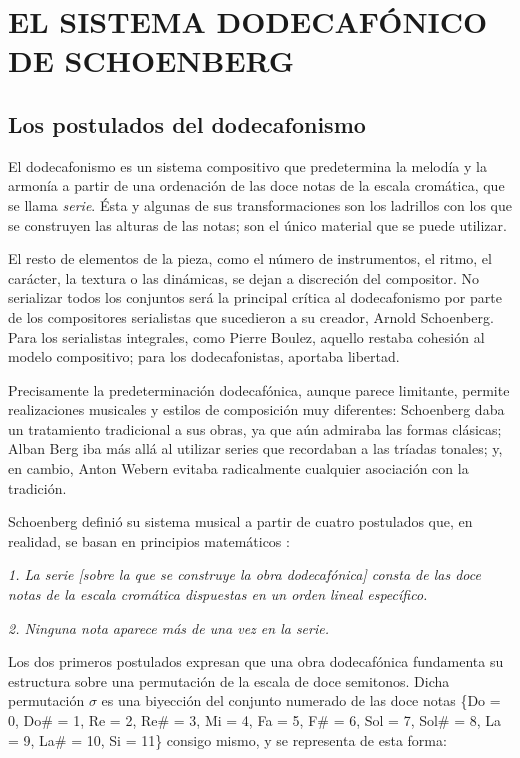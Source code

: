\section[EL SISTEMA DODECAF\'ONICO DE SCHOENBERG]{EL SISTEMA DODECAF\'ONICO DE SCHOENBERG}\label{ch:dodecafonismo}
	\subsection{Los postulados del dodecafonismo}
		El dodecafonismo es un sistema compositivo que predetermina la melod\'ia y la armon\'ia a partir de una ordenaci\'on de las doce notas de la escala crom\'atica, que se llama \textit{serie}. \'Esta y algunas de sus transformaciones son los ladrillos con los que se construyen las alturas de las notas; son el \'unico material que se puede utilizar. 
		
		El resto de elementos de la pieza, como el n\'umero de instrumentos, el ritmo, el car\'acter, la textura o las din\'amicas, se dejan a discreci\'on del compositor. No serializar todos los conjuntos ser\'a la principal cr\'itica al dodecafonismo por parte de los compositores serialistas que sucedieron a su creador, Arnold Schoenberg. Para los serialistas integrales, como Pierre Boulez, aquello restaba cohesi\'on al modelo compositivo; para los dodecafonistas, aportaba libertad. \cite{boulez}
		
		Precisamente la predeterminaci\'on dodecaf\'onica, aunque parece limitante, permite realizaciones musicales y estilos de composici\'on muy diferentes: Schoenberg daba un tratamiento tradicional a sus obras, ya que a\'un admiraba las formas cl\'asicas; Alban Berg iba m\'as all\'a al utilizar series que recordaban a las tr\'iadas tonales; y, en cambio, Anton Webern evitaba radicalmente cualquier asociaci\'on con la tradici\'on. 
		
		Schoenberg defini\'o su sistema musical a partir de cuatro postulados que, en realidad, se basan en principios matem\'aticos \cite{dominguez}:
		
		\emph{1. La serie \emph{[sobre la que se construye la obra dodecaf\'onica]} consta de las doce notas de la escala crom\'atica dispuestas en un orden lineal espec\'ifico.}
		
		\emph{2. Ninguna nota aparece m\'as de una vez en la serie.}
		
		Los dos primeros postulados expresan que una obra dodecaf\'onica fundamenta su estructura sobre una permutaci\'on de la escala de doce semitonos. Dicha permutaci\'on $\sigma$ es una biyecci\'on del conjunto numerado de las doce notas \{Do = 0, Do\# = 1, Re = 2, Re\# = 3, Mi = 4, Fa = 5, F\# = 6, Sol = 7, Sol\# = 8, La = 9, La\# = 10, Si = 11\} consigo mismo, y se representa de esta forma:
		
